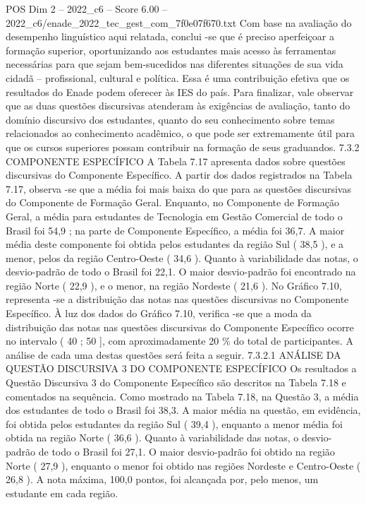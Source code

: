 \begin{textsample}{POS Dim 2 – 2022\_c6 – Score 6.00 – 2022\_c6/enade\_2022\_tec\_gest\_com\_7f0e07f670.txt}
Com base na avaliação do desempenho linguístico aqui relatada, conclui -se que é preciso aperfeiçoar a formação superior, oportunizando aos estudantes mais acesso às ferramentas necessárias para que sejam bem-sucedidos nas diferentes situações de sua vida cidadã – profissional, cultural e política.
Essa é uma contribuição efetiva que os resultados do Enade podem oferecer às IES do país.
Para finalizar, vale observar que as duas questões discursivas atenderam às exigências de avaliação, tanto do domínio discursivo dos estudantes, quanto do seu conhecimento sobre temas relacionados ao conhecimento acadêmico, o que pode ser extremamente útil para que os cursos superiores possam contribuir na formação de seus graduandos. 7.3.2 COMPONENTE ESPECÍFICO A Tabela 7.17 apresenta dados sobre questões discursivas do Componente Específico.
A partir dos dados registrados na Tabela 7.17, observa -se que a média foi mais baixa do que para as questões discursivas do Componente de Formação Geral.
Enquanto, no Componente de Formação Geral, a média para estudantes de Tecnologia em Gestão Comercial de todo o Brasil foi 54,9 ; na parte de Componente Específico, a média foi 36,7.
A maior média deste componente foi obtida pelos estudantes da região Sul ( 38,5 ), e a menor, pelos da região Centro-Oeste ( 34,6 ).
Quanto à variabilidade das notas, o desvio-padrão de todo o Brasil foi 22,1.
O maior desvio-padrão foi encontrado na região Norte ( 22,9 ), e o menor, na região Nordeste ( 21,6 ).
No Gráfico 7.10, representa -se a distribuição das notas nas questões discursivas no Componente Específico.
À luz dos dados do Gráfico 7.10, verifica -se que a moda da distribuição das notas nas questões discursivas do Componente Específico ocorre no intervalo ( 40 ; 50 ], com aproximadamente 20 \% do total de participantes.
A análise de cada uma destas questões será feita a seguir. 7.3.2.1 ANÁLISE DA QUESTÃO DISCURSIVA 3 DO COMPONENTE ESPECÍFICO Os resultados a Questão Discursiva 3 do Componente Específico são descritos na Tabela 7.18 e comentados na sequência.
Como mostrado na Tabela 7.18, na Questão 3, a média dos estudantes de todo o Brasil foi 38,3.
A maior média na questão, em evidência, foi obtida pelos estudantes da região Sul ( 39,4 ), enquanto a menor média foi obtida na região Norte ( 36,6 ).
Quanto à variabilidade das notas, o desvio-padrão de todo o Brasil foi 27,1.
O maior desvio-padrão foi obtido na região Norte ( 27,9 ), enquanto o menor foi obtido nas regiões Nordeste e Centro-Oeste ( 26,8 ).
A nota máxima, 100,0 pontos, foi alcançada por, pelo menos, um estudante em cada região.

\end{textsample}
